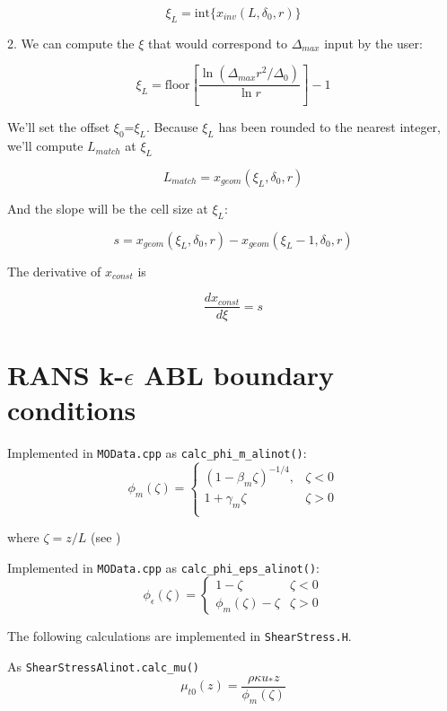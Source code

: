 \documentclass{article}
\begin{document}
$$
\xi_L = \textrm{int}\{ x_{inv}(L, \delta_0, r) \}
$$

2.  We can compute the $\xi$ that would correspond to $\Delta_{max}$ input by the user:

$$
\xi_L = \textrm{floor} \left[ \frac{\ln (\Delta_{max} r^2/\Delta_0)}{\ln r} \right] - 1
$$

We'll set the offset $\xi_0$=$\xi_L$. Because $\xi_L$ has been rounded to the nearest integer, we'll compute $L_{match}$ at $\xi_L$

$$
L_{match} = x_{geom}(\xi_L, \delta_0, r)
$$

And the slope will be the cell size at $\xi_L$: 

$$
s =  x_{geom}(\xi_L, \delta_0, r) -  x_{geom}(\xi_L-1, \delta_0, r)
$$

The derivative of $x_{const}$ is

$$
\frac{d x_{const}}{d\xi} = s
$$

\section{RANS k-$\epsilon$ ABL boundary conditions}

Implemented in \texttt{MOData.cpp} as \texttt{calc\_phi\_m\_alinot()}: 
\begin{equation}
\phi_m\left(\zeta \right) =
\begin{cases}
\left( 1 - \beta_m \zeta \right)^{-1/4}, & \zeta < 0\\
1+ \gamma_m \zeta                       & \zeta > 0\\
\end{cases}
\end{equation}

where $\zeta=z/L$ (see \cite{alinot2005k})

Implemented in \texttt{MOData.cpp} as \texttt{calc\_phi\_eps\_alinot()}: 
\begin{equation}
  \phi_\epsilon\left( \zeta \right) =
  \begin{cases}
    1-\zeta                            & \zeta < 0\\
    \phi_m\left( \zeta \right) - \zeta & \zeta > 0
  \end{cases}
  \end{equation}

The following calculations are implemented in \texttt{ShearStress.H}.

As \texttt{ShearStressAlinot.calc\_mu()}
\begin{equation}
  \mu_{t0}(z) = \frac{\rho \kappa u_* z}{\phi_m(\zeta)}
\end{equation}
\end{document}
